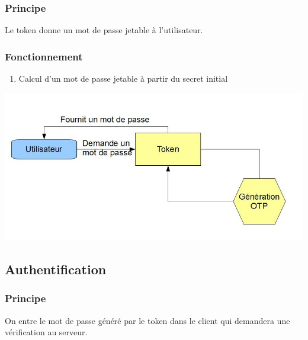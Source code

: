 \documentclass{"../../res/univ-projet"}
\begin{document}
\subsubsection{Principe}
Le token donne un mot de passe jetable à l'utilisateur.

\subsubsection{Fonctionnement}
\begin{enumerate}
    \item Calcul d'un mot de passe jetable à partir du secret 
        initial
\end{enumerate}
\includegraphics[width=\textwidth]{../graphics/generation.jpg}

\subsection{Authentification}
\subsubsection{Principe}
On entre le mot de passe généré par le token dans le client qui demandera une
vérification au serveur.
\end{document}
